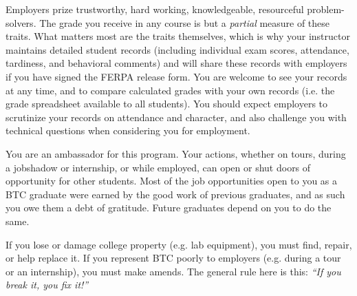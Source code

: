 \vskip 10pt



\noindent
{} Employers prize trustworthy, hard working, knowledgeable, resourceful problem-solvers.  The grade you receive in any course is but a {\it partial} measure of these traits.  What matters most are the traits themselves, which is why your instructor maintains detailed student records (including individual exam scores, attendance, tardiness, and behavioral comments) and will share these records with employers if you have signed the FERPA release form.  You are welcome to see your records at any time, and to compare calculated grades with your own records (i.e. the grade spreadsheet available to all students).  You should expect employers to scrutinize your records on attendance and character, and also challenge you with technical questions when considering you for employment.

\vskip 10pt

\noindent
{} You are an ambassador for this program.  Your actions, whether on tours, during a jobshadow or internship, or while employed, can open or shut doors of opportunity for other students.  Most of the job opportunities open to you as a BTC graduate were earned by the good work of previous graduates, and as such you owe them a debt of gratitude.  Future graduates depend on you to do the same.

\vskip 10pt

\noindent
{} If you lose or damage college property (e.g. lab equipment), you must find, repair, or help replace it.  If you represent BTC poorly to employers (e.g. during a tour or an internship), you must make amends.  The general rule here is this: {\it ``If you break it, you fix it!''}  

